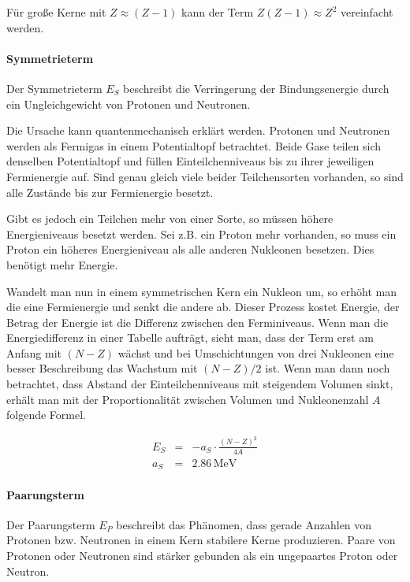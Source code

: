 \documentclass[12pt,a4paper]{scrartcl}
\numberwithin{equation}{section} %
\begin{document}
Für große Kerne mit $Z\approx(Z-1)$ kann der Term $Z(Z-1)\approx Z^2$ vereinfacht werden.

\hypertarget{symmetrieterm}{%
\paragraph{Symmetrieterm}\label{symmetrieterm}}

Der Symmetrieterm $E_S$ beschreibt die Verringerung der Bindungsenergie durch ein Ungleichgewicht von Protonen und Neutronen.

Die Ursache kann quantenmechanisch erklärt werden. Protonen und Neutronen werden als Fermigas in einem Potentialtopf betrachtet. Beide Gase teilen sich denselben Potentialtopf und füllen Einteilchenniveaus bis zu ihrer jeweiligen Fermienergie auf. Sind genau gleich viele beider Teilchensorten vorhanden, so sind alle Zustände bis zur Fermienergie besetzt.

Gibt es jedoch ein Teilchen mehr von einer Sorte, so müssen höhere Energieniveaus besetzt werden. Sei z.B. ein Proton mehr vorhanden, so muss ein Proton ein höheres Energieniveau als alle anderen Nukleonen besetzen. Dies benötigt mehr Energie.

Wandelt man nun in einem symmetrischen Kern ein Nukleon um, so erhöht man die eine Fermienergie und senkt die andere ab. Dieser Prozess kostet Energie, der Betrag der Energie ist die Differenz zwischen den Ferminiveaus. Wenn man die Energiedifferenz in einer Tabelle aufträgt, sieht man, dass der Term erst am Anfang mit $(N-Z)$ wächst und bei Umschichtungen von drei Nukleonen eine besser Beschreibung das Wachstum mit $(N-Z)/2$ ist. Wenn man dann noch betrachtet, dass Abstand der Einteilchenniveaus mit steigendem Volumen sinkt, erhält man mit der Proportionalität zwischen Volumen und Nukleonenzahl $A$ folgende Formel.

\begin{eqnarray}
    E_S &=& - a_S\cdot \frac{(N-Z)^2}{4A} \label{Symmetrieterm} \\
    a_S &=& 2.86\mathrm{\,MeV}
\end{eqnarray}

\hypertarget{paarungsterm}{%
\paragraph{Paarungsterm}\label{paarungsterm}}

Der Paarungsterm $E_P$ beschreibt das Phänomen, dass gerade Anzahlen von Protonen bzw. Neutronen in einem Kern stabilere Kerne produzieren. Paare von Protonen oder Neutronen sind stärker gebunden als ein ungepaartes Proton oder Neutron.
\end{document}
